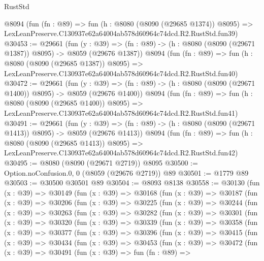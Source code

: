 \begin{lexlean}{RustStd}
\begin{coremodule}
    @8094
    (fun (fn : @89) =>
    fun (h : @8080 (@8090 (@29685 @1374)) @8095) =>
    LexLeanPreserve.C130937e62a64004ab578d60964c74dcd.R2.RustStd.fun39)
@30453 := @29661
    (fun (y : @39) =>
    (fn : @89) -> (h : @8080 (@8090 (@29671 @1387)) @8095) -> @8059 (@29676 @1387))
    @8094
    (fun (fn : @89) =>
    fun (h : @8080 (@8090 (@29685 @1387)) @8095) =>
    LexLeanPreserve.C130937e62a64004ab578d60964c74dcd.R2.RustStd.fun40)
@30472 := @29661
    (fun (y : @39) =>
    (fn : @89) -> (h : @8080 (@8090 (@29671 @1400)) @8095) -> @8059 (@29676 @1400))
    @8094
    (fun (fn : @89) =>
    fun (h : @8080 (@8090 (@29685 @1400)) @8095) =>
    LexLeanPreserve.C130937e62a64004ab578d60964c74dcd.R2.RustStd.fun41)
@30491 := @29661
    (fun (y : @39) =>
    (fn : @89) -> (h : @8080 (@8090 (@29671 @1413)) @8095) -> @8059 (@29676 @1413))
    @8094
    (fun (fn : @89) =>
    fun (h : @8080 (@8090 (@29685 @1413)) @8095) =>
    LexLeanPreserve.C130937e62a64004ab578d60964c74dcd.R2.RustStd.fun42)
@30495 := @8080 (@8090 (@29671 @2719)) @8095
@30500 := Option.noConfusion.{0, 0} (@8059 (@29676 @2719)) @89
@30501 := @1779 @89
@30503 := @30500 @30501 @89
@30504 := @8093 @8138
@30558 := @30130
    (fun (x : @39) =>
    @30149
      (fun (x : @39) =>
      @30168
        (fun (x : @39) =>
        @30187
          (fun (x : @39) =>
          @30206
            (fun (x : @39) =>
            @30225
              (fun (x : @39) =>
              @30244
                (fun (x : @39) =>
                @30263
                  (fun (x : @39) =>
                  @30282
                    (fun (x : @39) =>
                    @30301
                      (fun (x : @39) =>
                      @30320
                        (fun (x : @39) =>
                        @30339
                          (fun (x : @39) =>
                          @30358
                            (fun (x : @39) =>
                            @30377
                              (fun (x : @39) =>
                              @30396
                                (fun (x : @39) =>
                                @30415
                                  (fun (x : @39) =>
                                  @30434
                                    (fun (x : @39) =>
                                    @30453
                                      (fun (x : @39) =>
                                      @30472
                                        (fun (x : @39) =>
                                        @30491
                                          (fun (x : @39) =>
                                          fun (fn : @89) =>

\end{coremodule}
\end{lexlean}
